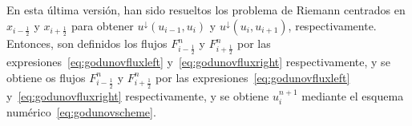 En esta última versión, han sido resueltos los problema de Riemann
centrados en $x_{i-\frac{1}{2}}$ y $x_{i+\frac{1}{2}}$ para obtener
$u^{\downarrow}\left(u_{i-1},u_{i}\right)$ y
$u^{\downarrow}\left(u_{i},u_{i+1}\right)$, respectivamente.
Entonces, son definidos los flujos $F^{n}_{i-\frac{1}{2}}$ y
$F^{n}_{i+\frac{1}{2}}$ por las
expresiones~\eqref{eq:godunovfluxleft} y~\eqref{eq:godunovfluxright}
respectivamente, y se obtiene os flujos $F^{n}_{i-\frac{1}{2}}$ y
$F^{n}_{i+\frac{1}{2}}$ por las
expresiones~\eqref{eq:godunovfluxleft} y~\eqref{eq:godunovfluxright}
respectivamente, y se obtiene $u^{n+1}_{i}$ mediante el esquema
numérico~\eqref{eq:godunovscheme}.